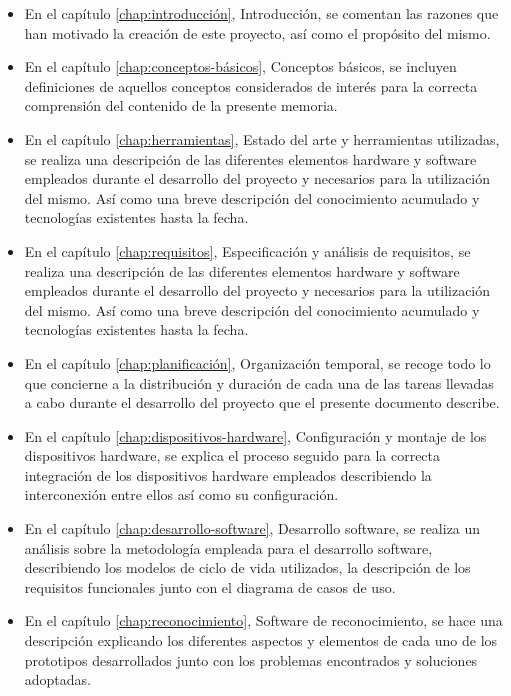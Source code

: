 \begin{itemize}

\item En el capítulo \ref{chap:introducción}, Introducción, se comentan las razones que han motivado la creación de este proyecto, así como el propósito del mismo.

\item En el capítulo \ref{chap:conceptos-básicos}, Conceptos básicos, se incluyen definiciones de aquellos conceptos considerados de interés para la correcta comprensión del contenido de la presente memoria.

\item En el capítulo \ref{chap:herramientas}, Estado del arte y herramientas utilizadas, se realiza una descripción de las diferentes elementos hardware y software empleados durante el desarrollo del proyecto y necesarios para la utilización del mismo. Así como una breve descripción del conocimiento acumulado y tecnologías existentes hasta la fecha.

\item En el capítulo \ref{chap:requisitos}, Especificación y análisis de requisitos, se realiza una descripción de las diferentes elementos hardware y software empleados durante el desarrollo del proyecto y necesarios para la utilización del mismo. Así como una breve descripción del conocimiento acumulado y tecnologías existentes hasta la fecha.

\item En el capítulo \ref{chap:planificación}, Organización temporal, se recoge todo lo que concierne a la distribución y duración de cada una de las tareas llevadas a cabo durante el desarrollo del proyecto que el presente documento describe.

\item En el capítulo \ref{chap:dispositivos-hardware}, Configuración y montaje de los dispositivos hardware, se explica el proceso seguido para la correcta integración de los dispositivos hardware empleados describiendo la interconexión entre ellos así como su configuración. 

\item En el capítulo \ref{chap:desarrollo-software}, Desarrollo software, se realiza un análisis sobre la metodología empleada para el desarrollo software, describiendo los modelos de ciclo de vida utilizados, la descripción de los requisitos funcionales junto con el diagrama de casos de uso.

\item En el capítulo \ref{chap:reconocimiento}, Software de reconocimiento, se hace una descripción explicando los diferentes aspectos y elementos de cada uno de los prototipos desarrollados junto con los problemas encontrados y soluciones adoptadas.


\end{itemize}
